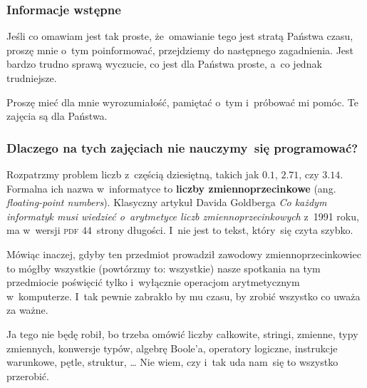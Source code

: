 \documentclass[10pt,t]{beamer}
\begin{document}
\begin{frame}
  \frametitle{Informacje wstępne}


  Jeśli co omawiam jest tak proste, że~omawianie tego jest stratą Państwa
  czasu, proszę mnie o~tym poinformować, przejdziemy do następnego
  zagadnienia. Jest bardzo trudno sprawą wyczucie, co jest dla Państwa
  proste, a~co jednak trudniejsze.

  Proszę mieć dla mnie wyrozumiałość, pamiętać o~tym i~próbować mi pomóc.
  Te zajęcia są dla Państwa.

\end{frame}





\begin{frame}
  \frametitle{Dlaczego na tych zajęciach nie nauczymy~się
    programować?}


  Rozpatrzmy problem liczb z~częścią dziesiętną, takich jak $0.1$, $2.71$,
  czy $3.14$. Formalna ich nazwa w~informatyce to \textbf{liczby
    zmiennoprzecinkowe} (ang. \textit{floating-point numbers}). Klasyczny
  artykuł Davida Goldberga
  {\textit{Co każdym informatyk musi wiedzieć o~arytmetyce liczb
      zmiennoprzecinkowych}} z~1991 roku, ma w~wersji \textsc{pdf}
  $44$~strony długości. I~nie jest to tekst, który~się czyta szybko.

  Mówiąc inaczej, gdyby ten przedmiot prowadził zawodowy
  zmiennoprzecinkowiec to mógłby \alert{wszystkie} (powtórzmy to:
  wszystkie) nasze spotkania na tym przedmiocie poświęcić tylko i~wyłącznie
  operacjom arytmetycznym w~komputerze. I~tak pewnie zabrakło by mu czasu,
  by zrobić wszystko co uważa za ważne.

  Ja tego nie będę robił, bo trzeba omówić liczby całkowite, stringi,
  zmienne, typy zmiennych, konwersje typów, algebrę Boole’a, operatory
  logiczne, instrukcje warunkowe, pętle, struktur, \ldots{} Nie wiem, czy i~tak
  uda nam~się to wszystko przerobić.

\end{frame}
\end{document}

